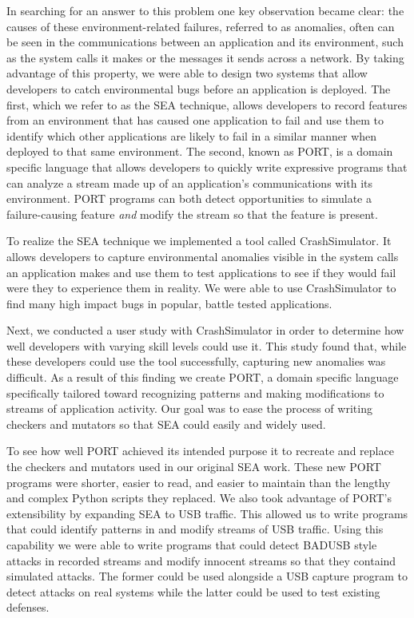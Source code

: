 In searching for an answer to this problem one key observation became clear:
the causes of these environment-related failures,
referred to as anomalies,
often can be seen in the
communications between an application and its environment, such as the
system calls it makes or the messages it sends across a network.
By taking advantage of this property, we were able to design two systems that allow developers to catch environmental bugs
before an application is deployed. 
The first,
which we refer to as the SEA technique,
allows developers to record features from an environment
that has caused one application to fail and use them to identify which other
applications are likely to fail in a similar manner when deployed to that same environment.
The second,
known as PORT,
is a domain specific language that allows developers
to quickly write expressive programs that can analyze a stream made up of
an application’s communications with its environment.
PORT programs can both detect opportunities to
simulate a failure-causing feature \textit{and} modify the stream so that
the feature is present.

To realize the SEA technique we implemented a tool called CrashSimulator.
It allows developers to capture environmental anomalies visible in the
system calls an application makes and use them to test applications to see
if they would fail were they to experience them in reality.
We were able to use CrashSimulator to find many high impact bugs in
popular,
battle tested applications.

Next, we conducted a user study with CrashSimulator in order to determine
how well developers with varying skill levels could use it.
This study found that,
while these developers could use the tool successfully,
capturing new anomalies was difficult.
As a result of this finding we create PORT,
a domain specific language
specifically tailored toward recognizing patterns and making modifications
to streams of application activity.
Our goal was to ease the process of
writing checkers and mutators so that SEA could easily and widely used.

To see how well PORT achieved its intended purpose it to recreate and
replace the checkers and mutators used in our original SEA work.
These new PORT programs were shorter, easier to read, and easier to
maintain than the lengthy and complex Python scripts they replaced.
We also took advantage of PORT's extensibility by expanding SEA to USB
traffic.
This allowed us to write programs that could identify patterns in and
modify streams of USB traffic.
Using this capability we were able to write programs that could
detect BADUSB style attacks in recorded streams and modify innocent streams
so that they containd simulated attacks.
The former could be used alongside a USB capture program to detect attacks
on real systems while the latter could be used to test existing defenses.

